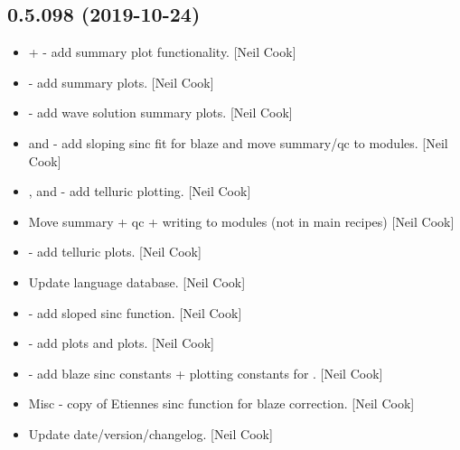 \documentclass[a4paper,10pt,english]{report}
\begin{document}
\subsection{0.5.098 (2019-10-24)}
\label{\detokenize{misc/changelog:id44}}\begin{itemize}
\item {} 
 +  - add summary
plot functionality. {[}Neil Cook{]}

\item {} 
 - add summary plots. {[}Neil Cook{]}

\item {} 
 - add wave solution
summary plots. {[}Neil Cook{]}

\item {} 
 and  - add sloping sinc fit for blaze and
move summary/qc to modules. {[}Neil Cook{]}

\item {} 
,  and  -
add telluric plotting. {[}Neil Cook{]}

\item {} 
Move summary + qc + writing to modules (not in main recipes) {[}Neil
Cook{]}

\item {} 
 - add telluric plots. {[}Neil Cook{]}

\item {} 
Update language database. {[}Neil Cook{]}

\item {} 
 - add sloped sinc function. {[}Neil Cook{]}

\item {} 
 - add  plots
and  plots. {[}Neil Cook{]}

\item {} 
 - add blaze sinc constants + plotting
constants for . {[}Neil Cook{]}

\item {} 
Misc - copy of Etiennes sinc function for blaze correction. {[}Neil
Cook{]}

\item {} 
Update date/version/changelog. {[}Neil Cook{]}

\end{itemize}
\end{document}

